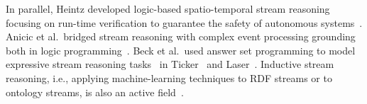 In parallel, Heintz developed logic-based spatio-temporal stream
reasoning focusing on run-time verification to guarantee the safety of
autonomous systems~\cite{DeLengHeintz2016AAAI}.  Anicic
et al.\ bridged stream reasoning with complex event processing
grounding both in logic
programming~\cite{DBLP:journals/semweb/AnicicRFS12}. Beck et al.\ used
answer set programming to model expressive stream reasoning
tasks~\cite{DBLP:conf/aaai/BeckDEF15} in
Ticker~\cite{DBLP:journals/tplp/BeckEB17} and
Laser~\cite{DBLP:conf/semweb/BazoobandiBU17}.  Inductive stream
reasoning, i.e., applying machine-learning techniques to RDF streams
or to ontology streams, is also an active
field~\cite{DBLP:journals/expert/BarbieriBCVHTRW10,DBLP:conf/ijcai/ChenLPC17,DBLP:conf/ijcai/LecueP13}.

